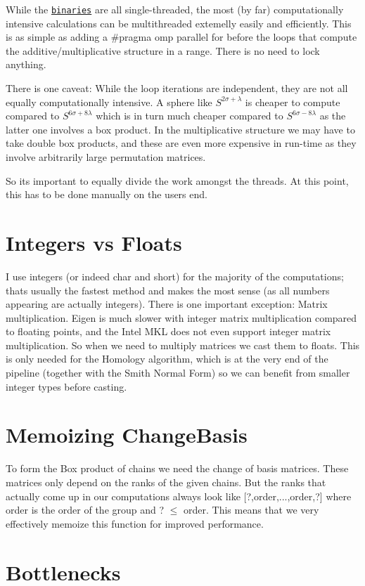 \begin{DoxyItemize}
\item While the \href{https://github.com/NickG-Math/Mackey/tree/master/bin}{\tt binaries} are all single-\/threaded, the most (by far) computationally intensive calculations can be multithreaded extemelly easily and efficiently. This is as simple as adding a {\ttfamily \#pragma omp parallel for} before the loops that compute the additive/multiplicative structure in a range. There is no need to lock anything.
\item There is one caveat\+: While the loop iterations are independent, they are not all equally computationally intensive. A sphere like $S^{2\sigma+\lambda}$ is cheaper to compute compared to $S^{6\sigma+8\lambda}$ which is in turn much cheaper compared to $S^{6\sigma-8\lambda}$ as the latter one involves a box product. In the multiplicative structure we may have to take double box products, and these are even more expensive in run-\/time as they involve arbitrarily large permutation matrices.
\item So it\textquotesingle{}s important to equally divide the work amongst the threads. At this point, this has to be done manually on the user\textquotesingle{}s end.
\end{DoxyItemize}\hypertarget{perf_intvsfloat}{}\section{Integers vs Floats}\label{perf_intvsfloat}
I use integers (or indeed {\ttfamily char} and {\ttfamily short}) for the majority of the computations; that\textquotesingle{}s usually the fastest method and makes the most sense (as all numbers appearing are actually integers). There is one important exception\+: Matrix multiplication. Eigen is much slower with integer matrix multiplication compared to floating points, and the Intel M\+KL does not even support integer matrix multiplication. So when we need to multiply matrices we cast them to floats. This is only needed for the Homology algorithm, which is at the very end of the pipeline (together with the Smith Normal Form) so we can benefit from smaller integer types before casting.\hypertarget{perf_memo}{}\section{Memoizing Change\+Basis}\label{perf_memo}
To form the Box product of chains we need the change of basis matrices. These matrices only depend on the ranks of the given chains. But the ranks that actually come up in our computations always look like \mbox{[}?,order,...,order,?\mbox{]} where order is the order of the group and ? $\le$ order. This means that we very effectively memoize this function for improved performance.\hypertarget{perf_bottle}{}\section{Bottlenecks}\label{perf_bottle}

